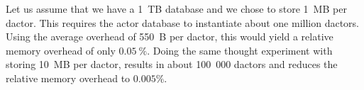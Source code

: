   Let us assume that we have a 1~TB database and we chose to store 1~MB per \gls{dactor}.
  This requires the actor database to instantiate about one million \glspl{dactor}.
  Using the average overhead of 550~B per \gls{dactor}, this would yield a relative memory overhead of only $0.05~\%$.
  Doing the same thought experiment with storing 10~MB per \gls{dactor}, results in about 100~000 \glspl{dactor} and reduces the relative memory overhead to $0.005 \%$.
